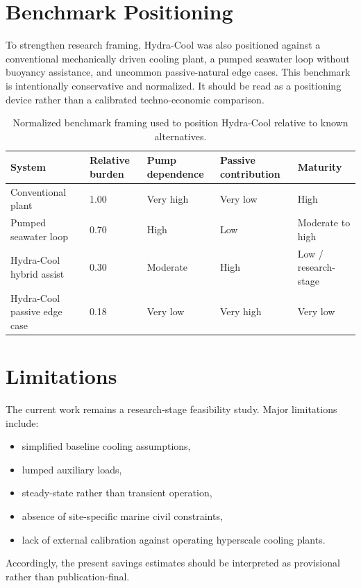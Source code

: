 \documentclass[11pt]{article}
\begin{document}
\section{Benchmark Positioning}

To strengthen research framing, Hydra-Cool was also positioned against a conventional mechanically driven cooling plant, a pumped seawater loop without buoyancy assistance, and uncommon passive-natural edge cases. This benchmark is intentionally conservative and normalized. It should be read as a positioning device rather than a calibrated techno-economic comparison.

\begin{table}[h]
\centering
\begin{tabular}{lllll}
\toprule
System & Relative burden & Pump dependence & Passive contribution & Maturity \\
\midrule
Conventional plant & 1.00 & Very high & Very low & High \\
Pumped seawater loop & 0.70 & High & Low & Moderate to high \\
Hydra-Cool hybrid assist & 0.30 & Moderate & High & Low / research-stage \\
Hydra-Cool passive edge case & 0.18 & Very low & Very high & Very low \\
\bottomrule
\end{tabular}
\caption{Normalized benchmark framing used to position Hydra-Cool relative to known alternatives.}
\end{table}

\section{Limitations}

The current work remains a research-stage feasibility study. Major limitations include:

\begin{itemize}
  \item simplified baseline cooling assumptions,
  \item lumped auxiliary loads,
  \item steady-state rather than transient operation,
  \item absence of site-specific marine civil constraints,
  \item lack of external calibration against operating hyperscale cooling plants.
\end{itemize}

Accordingly, the present savings estimates should be interpreted as provisional rather than publication-final.
\end{document}
